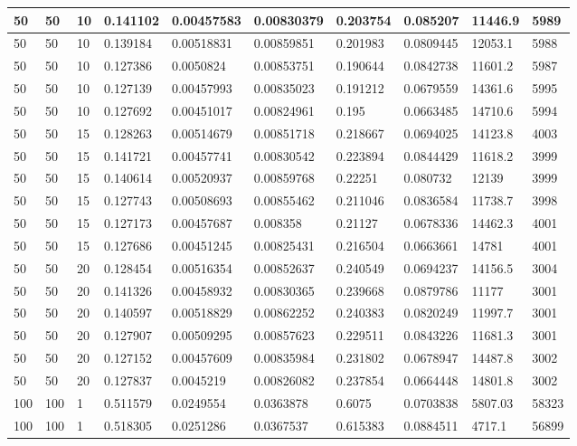 \begin{landscape}
\begin{longtable}{ | l | l | l | l | l | l | l | l | l | l | }
50 & 50 & 10 & 0.141102 & 0.00457583 & 0.00830379 & 0.203754 & 0.085207 & 11446.9 & 5989\\ \hline
50 & 50 & 10 & 0.139184 & 0.00518831 & 0.00859851 & 0.201983 & 0.0809445 & 12053.1 & 5988\\ \hline
50 & 50 & 10 & 0.127386 & 0.0050824 & 0.00853751 & 0.190644 & 0.0842738 & 11601.2 & 5987\\ \hline
50 & 50 & 10 & 0.127139 & 0.00457993 & 0.00835023 & 0.191212 & 0.0679559 & 14361.6 & 5995\\ \hline
50 & 50 & 10 & 0.127692 & 0.00451017 & 0.00824961 & 0.195 & 0.0663485 & 14710.6 & 5994\\ \hline
50 & 50 & 15 & 0.128263 & 0.00514679 & 0.00851718 & 0.218667 & 0.0694025 & 14123.8 & 4003\\ \hline
50 & 50 & 15 & 0.141721 & 0.00457741 & 0.00830542 & 0.223894 & 0.0844429 & 11618.2 & 3999\\ \hline
50 & 50 & 15 & 0.140614 & 0.00520937 & 0.00859768 & 0.22251 & 0.080732 & 12139 & 3999\\ \hline
50 & 50 & 15 & 0.127743 & 0.00508693 & 0.00855462 & 0.211046 & 0.0836584 & 11738.7 & 3998\\ \hline
50 & 50 & 15 & 0.127173 & 0.00457687 & 0.008358 & 0.21127 & 0.0678336 & 14462.3 & 4001\\ \hline
50 & 50 & 15 & 0.127686 & 0.00451245 & 0.00825431 & 0.216504 & 0.0663661 & 14781 & 4001\\ \hline
50 & 50 & 20 & 0.128454 & 0.00516354 & 0.00852637 & 0.240549 & 0.0694237 & 14156.5 & 3004\\ \hline
50 & 50 & 20 & 0.141326 & 0.00458932 & 0.00830365 & 0.239668 & 0.0879786 & 11177 & 3001\\ \hline
50 & 50 & 20 & 0.140597 & 0.00518829 & 0.00862252 & 0.240383 & 0.0820249 & 11997.7 & 3001\\ \hline
50 & 50 & 20 & 0.127907 & 0.00509295 & 0.00857623 & 0.229511 & 0.0843226 & 11681.3 & 3001\\ \hline
50 & 50 & 20 & 0.127152 & 0.00457609 & 0.00835984 & 0.231802 & 0.0678947 & 14487.8 & 3002\\ \hline
50 & 50 & 20 & 0.127837 & 0.0045219 & 0.00826082 & 0.237854 & 0.0664448 & 14801.8 & 3002\\ \hline
100 & 100 & 1 & 0.511579 & 0.0249554 & 0.0363878 & 0.6075 & 0.0703838 & 5807.03 & 58323\\ \hline
100 & 100 & 1 & 0.518305 & 0.0251286 & 0.0367537 & 0.615383 & 0.0884511 & 4717.1 & 56899\\ \hline

\end{longtable}
\end{landscape}
